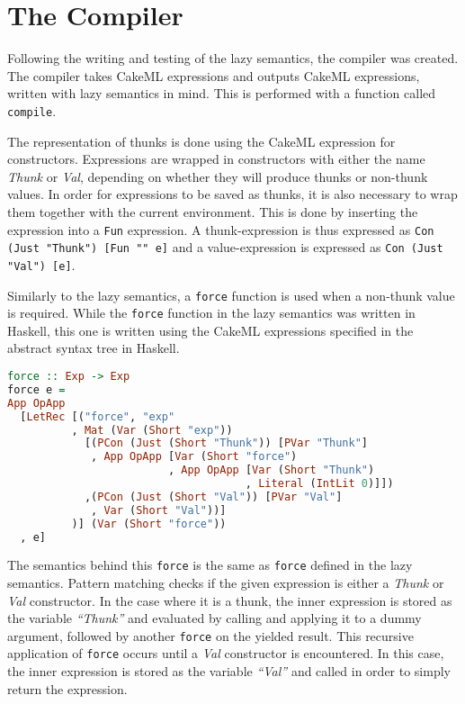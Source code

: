 \section{The Compiler}

Following the writing and testing of the lazy semantics, the compiler was
created. The compiler takes CakeML expressions and outputs CakeML expressions,
written with lazy semantics in mind. This is performed with a function called
\texttt{compile}.

The representation of thunks is done using the CakeML expression for
constructors. Expressions are wrapped in constructors with either the name
\textit{Thunk} or \textit{Val}, depending on whether they will produce thunks or
non-thunk values. In order for expressions to be saved as thunks, it is also
necessary to wrap them together with the current environment. This is done by
inserting the expression into a \texttt{Fun} expression. A thunk-expression is
thus expressed as \texttt{Con (Just "Thunk") [Fun "" e]} and a value-expression
is expressed as \texttt{Con (Just "Val") [e]}.

Similarly to the lazy semantics, a \texttt{force} function is used when a
non-thunk value is required. While the \texttt{force} function in the lazy
semantics was written in Haskell, this one is written using the CakeML
expressions specified in the abstract syntax tree in Haskell.

\noindent \begin{minipage}{\linewidth}
\begin{lstlisting}[caption=\texttt{force} in CakeML defined in Haskell, language=haskell]
force :: Exp -> Exp
force e =
App OpApp
  [LetRec [("force", "exp"
          , Mat (Var (Short "exp"))
            [(PCon (Just (Short "Thunk")) [PVar "Thunk"]
             , App OpApp [Var (Short "force")
                         , App OpApp [Var (Short "Thunk")
                                     , Literal (IntLit 0)]])
            ,(PCon (Just (Short "Val")) [PVar "Val"]
             , Var (Short "Val"))]
          )] (Var (Short "force"))
  , e]
\end{lstlisting}
\end{minipage}
The semantics behind this \texttt{force} is the same as \texttt{force} defined
in the lazy semantics. Pattern matching checks if the given expression is either
a \textit{Thunk} or \textit{Val} constructor. In the case where it is a thunk,
the inner expression is stored as the variable \textit{``Thunk''} and evaluated
by calling and applying it to a dummy argument, followed by another
\texttt{force} on the yielded result. This recursive application of
\texttt{force} occurs until a \textit{Val} constructor is encountered. In this
case, the inner expression is stored as the variable \textit{``Val''} and called
in order to simply return the expression.

